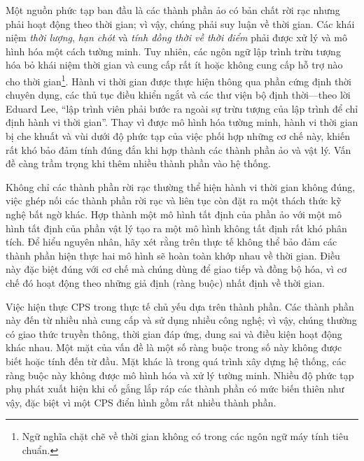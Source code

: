 Một nguồn phức tạp ban đầu là các thành phần ảo có bản chất rời rạc nhưng phải hoạt động theo thời gian; vì vậy, chúng phải suy luận về thời gian. Các khái niệm \emph{thời lượng}, \emph{hạn chót} và \emph{tính đồng thời về thời điểm} phải được xử lý và mô hình hóa một cách tường minh. Tuy nhiên, các ngôn ngữ lập trình trừu tượng hóa bỏ khái niệm thời gian và cung cấp rất ít hoặc không cung cấp hỗ trợ nào cho thời gian\footnote{Ngữ nghĩa chặt chẽ về thời gian không có trong các ngôn ngữ máy tính tiêu chuẩn.}. Hành vi thời gian được thực hiện thông qua phần cứng định thời chuyên dụng, các thủ tục điều khiển ngắt và các thư viện bộ định thời---theo lời Eduard Lee, ``lập trình viên phải bước ra ngoài sự trừu tượng của lập trình để chỉ định hành vi thời gian''. Thay vì được mô hình hóa tường minh, hành vi thời gian bị che khuất và vùi dưới độ phức tạp của việc phối hợp những cơ chế này, khiến rất khó bảo đảm tính đúng đắn khi hợp thành các thành phần ảo và vật lý. Vấn đề càng trầm trọng khi thêm nhiều thành phần vào hệ thống.

Không chỉ các thành phần rời rạc thường thể hiện hành vi thời gian không đúng, việc ghép nối các thành phần rời rạc và liên tục còn đặt ra một thách thức kỹ nghệ bất ngờ khác. Hợp thành một mô hình tất định của phần ảo với một mô hình tất định của phần vật lý tạo ra một mô hình không tất định rất khó phân tích. Để hiểu nguyên nhân, hãy xét rằng trên thực tế không thể bảo đảm các thành phần hiện thực hai mô hình sẽ hoàn toàn khớp nhau về thời gian. Điều này đặc biệt đúng với cơ chế mà chúng dùng để giao tiếp và đồng bộ hóa, vì cơ chế đó hoạt động theo những giả định (ràng buộc) nhất định về thời gian.

Việc hiện thực CPS trong thực tế chủ yếu dựa trên thành phần. Các thành phần này đến từ nhiều nhà cung cấp và sử dụng nhiều công nghệ; vì vậy, chúng thường có giao thức truyền thông, thời gian đáp ứng, dung sai và điều kiện hoạt động khác nhau. Một mặt của vấn đề là một số ràng buộc trong số này không được biết hoặc tính đến từ đầu. Mặt khác là trong quá trình xây dựng hệ thống, các ràng buộc này không được mô hình hóa và xử lý tường minh. Nhiều độ phức tạp phụ phát xuất hiện khi cố gắng lắp ráp các thành phần có mức biến thiên như vậy, đặc biệt vì một CPS điển hình gồm rất nhiều thành phần.


